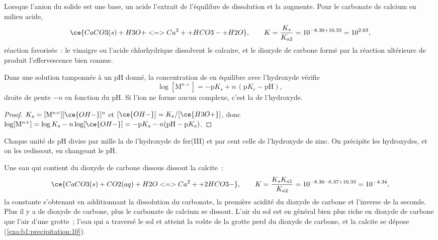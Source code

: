 Lorsque l'anion du solide est une base, un acide l'extrait de
l'équilibre de dissolution et la  augmente. Pour le carbonate
de calcium en milieu acide,
\[
  \ce{CaCO3(s) + H3O+ <=> Ca^2+ + HCO3- + H2O}, \qquad
  K = \frac{K_s}{K_{a2}} = 10^{-8.30 + 10.33} = 10^{2.03} ,
\]
réaction favorisée~: le vinaigre ou l'acide chlorhydrique dissolvent le
calcaire, et le dioxyde de carbone formé par la réaction ultérieure de
 produit l'effervescence bien connue.

\begin{proposition}\label{prop:b1:precipitation:hydroxide-ph}
Dans une solution tamponnée à un pH donné, la concentration de 
en équilibre avec l'hydroxyde  vérifie
\[
  \log[\mathrm{M}^{n+}] = -\mathrm{p}K_s + n\,(\mathrm{p}K_e - \mathrm{pH}) ,
\]
droite de pente $-n$ en fonction du pH. Si l'ion ne forme aucun
complexe, c'est la  de l'hydroxyde.
\end{proposition}

\begin{proof}
$K_s = [\mathrm{M}^{n+}][\ce{OH-}]^n$ et $[\ce{OH-}] = K_e/[\ce{H3O+}]$,
donc $\log[\mathrm{M}^{n+}] = \log K_s - n\log[\ce{OH-}] = -\mathrm{p}K_s -
n(\mathrm{pH} - \mathrm{p}K_e)$.
\end{proof}

Chaque unité de pH divise par mille la  de l'hydroxyde de
fer(III) et par cent celle de l'hydroxyde de zinc. On précipite les
hydroxydes, et on les redissout, en changeant le pH.

\begin{example}\label{ex:b1:precipitation:cave}
Une eau qui contient du dioxyde de carbone dissous dissout la calcite~:
\[
  \ce{CaCO3(s) + CO2(aq) + H2O <=> Ca^2+ + 2HCO3-}, \qquad
  K = \frac{K_s K_{a1}}{K_{a2}} = 10^{-8.30 - 6.37 + 10.33} = 10^{-4.34} ,
\]
la constante s'obtenant en additionnant la dissolution du carbonate, la
première acidité du dioxyde de carbone et l'inverse de la seconde. Plus
il y a de dioxyde de carbone, plus le carbonate de calcium se dissout.
L'air du sol est en général bien plus riche en dioxyde de carbone que
l'air d'une grotte~; l'eau qui a traversé le sol et atteint la voûte de
la grotte perd du dioxyde de carbone, et la calcite se dépose
(\cref{exo:b1:precipitation:10}).
\end{example}

